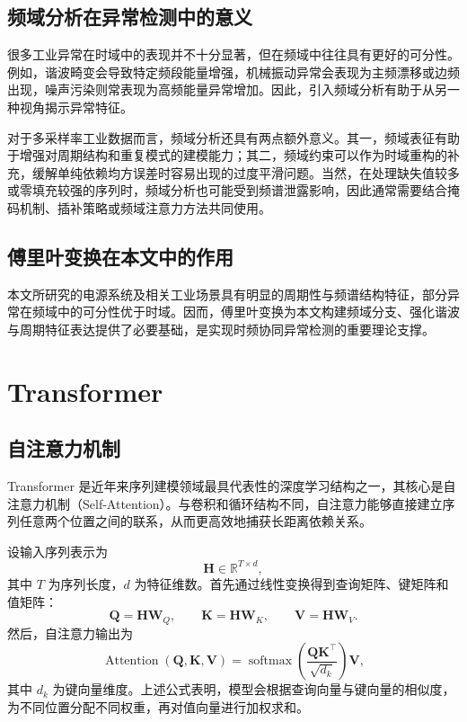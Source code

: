 \subsection{频域分析在异常检测中的意义}

很多工业异常在时域中的表现并不十分显著，但在频域中往往具有更好的可分性。例如，谐波畸变会导致特定频段能量增强，机械振动异常会表现为主频漂移或边频出现，噪声污染则常表现为高频能量异常增加。因此，引入频域分析有助于从另一种视角揭示异常特征。

对于多采样率工业数据而言，频域分析还具有两点额外意义。其一，频域表征有助于增强对周期结构和重复模式的建模能力；其二，频域约束可以作为时域重构的补充，缓解单纯依赖均方误差时容易出现的过度平滑问题。当然，在处理缺失值较多或零填充较强的序列时，频域分析也可能受到频谱泄露影响，因此通常需要结合掩码机制、插补策略或频域注意力方法共同使用。

\subsection{傅里叶变换在本文中的作用}

本文所研究的电源系统及相关工业场景具有明显的周期性与频谱结构特征，部分异常在频域中的可分性优于时域。因而，傅里叶变换为本文构建频域分支、强化谐波与周期特征表达提供了必要基础，是实现时频协同异常检测的重要理论支撑。

\section{Transformer}

\subsection{自注意力机制}

Transformer 是近年来序列建模领域最具代表性的深度学习结构之一，其核心是自注意力机制（Self-Attention）。与卷积和循环结构不同，自注意力能够直接建立序列任意两个位置之间的联系，从而更高效地捕获长距离依赖关系。

设输入序列表示为
\begin{equation}
    \mathbf{H} \in \mathbb{R}^{T \times d},
\end{equation}
其中 $T$ 为序列长度，$d$ 为特征维数。首先通过线性变换得到查询矩阵、键矩阵和值矩阵：
\begin{equation}
    \mathbf{Q} = \mathbf{H}\mathbf{W}_Q,\qquad
    \mathbf{K} = \mathbf{H}\mathbf{W}_K,\qquad
    \mathbf{V} = \mathbf{H}\mathbf{W}_V.
\end{equation}
然后，自注意力输出为
\begin{equation}
    \operatorname{Attention}(\mathbf{Q}, \mathbf{K}, \mathbf{V}) =
    \operatorname{softmax}\!\left(
        \frac{\mathbf{Q}\mathbf{K}^{\top}}{\sqrt{d_k}}
    \right)\mathbf{V},
\end{equation}
其中 $d_k$ 为键向量维度。上述公式表明，模型会根据查询向量与键向量的相似度，为不同位置分配不同权重，再对值向量进行加权求和。

